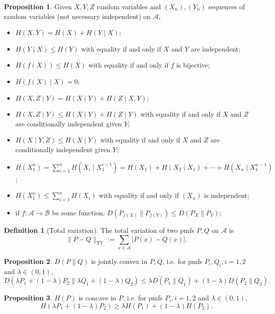 \documentclass[]{article}
\theoremstyle{definition}
\newtheorem*{definition}{Definition}
\newtheorem*{proposition}{Proposition}
\begin{document}
\begin{proposition}
  Given \(X, Y, Z\) random variables and \((X_n), (Y_n)\) sequences of random variables (not necessary independent) on 
    \(\mathscr{A}\),
  \begin{itemize}
    \item \(H(X, Y) = H(X) + H(Y \mid X)\);
    \item \(H(Y \mid X) \le H(Y)\) with equality if and only if \(X\) and \(Y\) are independent;
    \item \(H(f(X)) \le H(X)\) with equality if and only if \(f\) is bijective;
    \item \(H(f(X) \mid X) = 0\);
    \item \(H(X, Z \mid Y) = H(X \mid Y) + H(Z \mid X, Y)\);
    \item \(H(X, Z \mid Y) \le H(X \mid Y) + H(Z \mid Y)\) with equality if and only if \(X\) and 
      \(Z\) are conditionally independent given \(Y\);
    \item \(H(X \mid Y, Z) \le H(X \mid Y)\) with equality if and only if \(X\) and \(Z\) are 
      conditionally independent given \(Y\);
    \item \(H(X_1^n) = \sum_{i = 1}^n H(X_i \mid X_1^{i - 1}) = H(X_1) + H(X_2 \mid X_1) + \cdots + H(X_n \mid X_1^{n - 1})\);
    \item \(H(X_1^n) \le \sum_{i = 1}^n H(X_i)\) with equality if and only if \((X_n)\) is independent;
    \item if \(f : \mathscr{A} \to \mathscr{B}\) be some function, \(D(P_{f(X)} \| P_{f(Y)}) \le D(P_X \| P_Y)\);
  \end{itemize}
\end{proposition}

\begin{definition}[Total variation]
  The total variation of two pmfs \(P, Q\) on \(\mathscr{A}\) is 
  \[\|P - Q\|_{\text{TV}} := \sum_{x \in \mathscr{A}} |P(x) - Q(x)|.\]
\end{definition}

\begin{proposition}
  \(D(P \| Q)\) is jointly convex in \(P, Q\), i.e. for pmfs \(P_i, Q_i, i = 1, 2\) and \(\lambda \in (0, 1)\),
  \[D(\lambda P_1 + (1 - \lambda) P_2 \| \lambda Q_1 + (1 - \lambda) Q_2) \le \lambda D(P_1 \| Q_1) + (1 - \lambda) D(P_2 \| Q_2).\]
\end{proposition}

\begin{proposition}
  \(H(P)\) is concave in \(P\), i.e. for pmfs \(P_i, i = 1, 2\) and \(\lambda \in (0, 1)\),
  \[H(\lambda P_1 + (1 - \lambda) P_2) \ge \lambda H(P_1) + (1 - \lambda) H(P_2).\]
\end{proposition}
\end{document}
